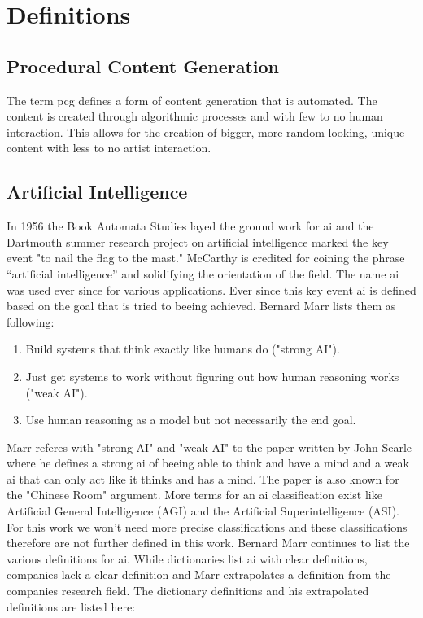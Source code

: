 \documentclass[10pt,a4paper]{article}
\begin{document}
\section{Definitions}
\subsection{Procedural Content Generation}
The term \gls{pcg} defines a form of content generation that is automated. The content is created through algorithmic processes and with few to no human interaction. This allows for the creation of bigger, more random looking, unique content with less to no artist interaction\cite{VanderLinden2014}.

\subsection{Artificial Intelligence}
In 1956 the Book Automata Studies\cite{McCarthy1956} layed the ground work for \gls{ai} and the Dartmouth summer research project on artificial intelligence marked the key event "to nail the flag to the mast." McCarthy is credited for coining the phrase “artificial intelligence” and solidifying the orientation of the field\cite{moor2006dartmouth}. The name \gls{ai} was used ever since for various applications. Ever since this key event \gls{ai} is defined based on the goal that is tried to beeing achieved. Bernard Marr lists them as following\cite{Marr2018}:
\begin{enumerate}
\item Build systems that think exactly like humans do ("strong AI"). 
\item Just get systems to work without figuring out how human reasoning works ("weak AI").
\item Use human reasoning as a model but not necessarily the end goal.
\end{enumerate}
Marr referes with "strong AI" and "weak AI" to the paper written by John Searle where he defines a strong \gls{ai} of beeing able to think and have a mind and a weak \gls{ai} that can only act like it thinks and has a mind. The paper is also known for the "Chinese Room" argument\cite{Searle1980}. More terms for an \gls{ai} classification exist like Artificial General Intelligence (AGI) and the Artificial Superintelligence (ASI). For this work we won't need more precise classifications and these classifications therefore are not further defined in this work. Bernard Marr continues to list the various definitions for \gls{ai}. While dictionaries list \gls{ai} with clear definitions, companies lack a clear definition and Marr extrapolates a definition from the companies research field. The dictionary definitions and his extrapolated definitions are listed here:
\end{document}
